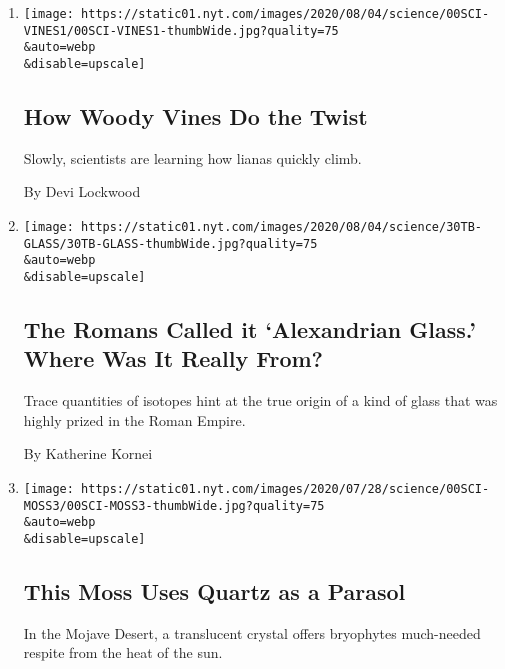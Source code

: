 \begin{enumerate}
\def\labelenumi{\arabic{enumi}.}
\item
  \href{/2020/08/01/science/vines-lianas-panama.html}{}

  \texttt{[image: https://static01.nyt.com/images/2020/08/04/science/00SCI-VINES1/00SCI-VINES1-thumbWide.jpg?quality=75\\\&auto=webp\\\&disable=upscale]}

  \hypertarget{how-woody-vines-do-the-twist}{%
  \subsection{How Woody Vines Do the
  Twist}\label{how-woody-vines-do-the-twist}}

  Slowly, scientists are learning how lianas quickly climb.

  By Devi Lockwood
\item
  \href{/2020/07/31/science/alexandrian-glass-rome.html}{}

  \texttt{[image: https://static01.nyt.com/images/2020/08/04/science/30TB-GLASS/30TB-GLASS-thumbWide.jpg?quality=75\\\&auto=webp\\\&disable=upscale]}

  \hypertarget{the-romans-called-it-alexandrian-glass-where-was-it-really-from}{%
  \subsection{The Romans Called it `Alexandrian Glass.' Where Was It
  Really
  From?}\label{the-romans-called-it-alexandrian-glass-where-was-it-really-from}}

  Trace quantities of isotopes hint at the true origin of a kind of
  glass that was highly prized in the Roman Empire.

  By Katherine Kornei
\item
  \href{/2020/07/29/science/moss-quartz-biology-syntrichia.html}{}

  \texttt{[image: https://static01.nyt.com/images/2020/07/28/science/00SCI-MOSS3/00SCI-MOSS3-thumbWide.jpg?quality=75\\\&auto=webp\\\&disable=upscale]}

  \hypertarget{this-moss-uses-quartz-as-a-parasol}{%
  \subsection{This Moss Uses Quartz as a
  Parasol}\label{this-moss-uses-quartz-as-a-parasol}}

  In the Mojave Desert, a translucent crystal offers bryophytes
  much-needed respite from the heat of the sun.


\end{enumerate}
